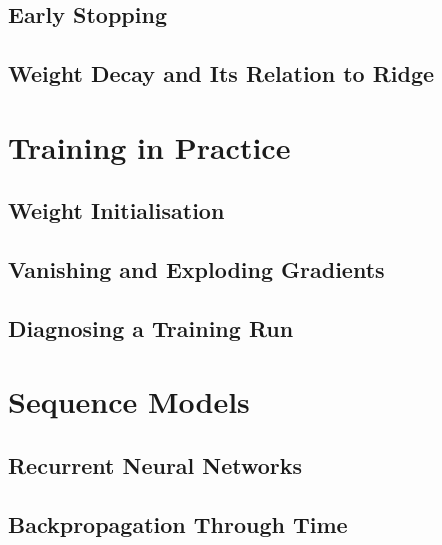 \subsection{Early Stopping}

\subsection{Weight Decay and Its Relation to Ridge}

\section{Training in Practice}
\label{sec:training-practice}

\subsection{Weight Initialisation}

\subsection{Vanishing and Exploding Gradients}

\subsection{Diagnosing a Training Run}

\section{Sequence Models}
\label{sec:sequence-models}


\subsection{Recurrent Neural Networks}

\subsection{Backpropagation Through Time}

